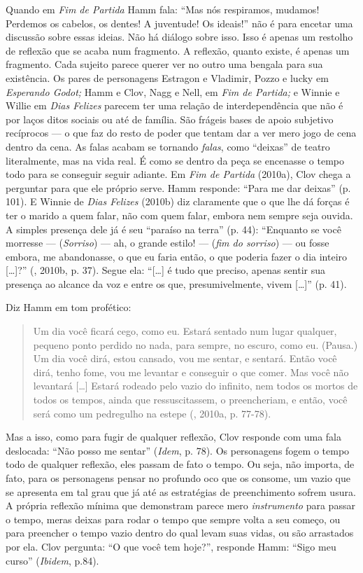 Quando em \emph{Fim de Partida} Hamm fala: ``Mas nós respiramos,
mudamos! Perdemos os cabelos, os dentes! A juventude! Os ideais!'' não é
para encetar uma discussão sobre essas ideias. Não há diálogo sobre
isso. Isso é apenas um restolho de reflexão que se acaba num fragmento.
A reflexão, quanto existe, é apenas um fragmento. Cada sujeito parece
querer ver no outro uma bengala para sua existência. Os pares de
personagens Estragon e Vladimir, Pozzo e lucky em \emph{Esperando
Godot;} Hamm e Clov, Nagg e Nell, em \emph{Fim de Partida;} e Winnie e
Willie em \emph{Dias Felizes} parecem ter uma relação de
interdependência que não é por laços ditos sociais ou até de família.
São frágeis bases de apoio subjetivo recíprocos --- o que faz do resto de
poder que tentam dar a ver mero jogo de cena dentro da cena. As falas
acabam se tornando \emph{falas}, como ``deixas'' de teatro literalmente,
mas na vida real. É como se dentro da peça se encenasse o tempo todo
para se conseguir seguir adiante. Em \emph{Fim de Partida} (2010a), Clov
chega a perguntar para que ele próprio serve. Hamm responde: ``Para me
dar deixas'' (p. 101). E Winnie de \emph{Dias Felizes} (2010b) diz
claramente que o que lhe dá forças é ter o marido a quem falar, não com
quem falar, embora nem sempre seja ouvida. A simples presença dele já é
seu ``paraíso na terra'' (p. 44): ``Enquanto se você morresse ---
(\emph{Sorriso}) --- ah, o grande estilo! --- (\emph{fim do sorriso}) ---
ou fosse embora, me abandonasse, o que eu faria então, o que poderia
fazer o dia inteiro [\ldots{}]?'' (, 2010b, p. 37). Segue
ela: ``[\ldots{}] é tudo que preciso, apenas sentir sua presença ao
alcance da voz e entre os que, presumivelmente, vivem [\ldots{}]'' (p.
41).

Diz Hamm em tom profético:

\begin{quote}
Um dia você ficará cego, como eu. Estará sentado num lugar qualquer,
pequeno ponto perdido no nada, para sempre, no escuro, como eu. (Pausa.)
Um dia você dirá, estou cansado, vou me sentar, e sentará. Então você
dirá, tenho fome, vou me levantar e conseguir o que comer. Mas você não
levantará [\ldots{}] Estará rodeado pelo vazio do infinito, nem
todos os mortos de todos os tempos, ainda que ressuscitassem, o
preencheriam, e então, você será como um pedregulho na estepe (, 2010a, p. 77-78).
\end{quote}

Mas a isso, como para fugir de qualquer reflexão, Clov responde com uma
fala deslocada: ``Não posso me sentar'' (\emph{Idem}, p. 78). Os
personagens fogem o tempo todo de qualquer reflexão, eles passam de fato
o tempo. Ou seja, não importa, de fato, para os personagens pensar no
profundo oco que os consome, um vazio que se apresenta em tal grau que
já até as estratégias de preenchimento sofrem usura. A própria reflexão
mínima que demonstram parece mero \emph{instrumento} para passar o
tempo, meras deixas para rodar o tempo que sempre volta a seu começo, ou
para preencher o tempo vazio dentro do qual levam suas vidas, ou são
arrastados por ela. Clov pergunta: ``O que você tem hoje?'', responde
Hamm: ``Sigo meu curso'' (\emph{Ibidem}, p.84).

